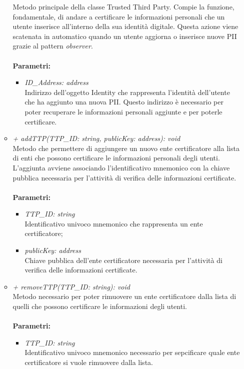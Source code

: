 \begin{itemize}
\begin{itemize}
		Metodo principale della classe Trusted Third Party. Compie la funzione, fondamentale, di andare a certificare le informazioni personali che un utente inserisce all'interno della sua identità digitale. Questa azione viene scatenata in automatico quando un utente aggiorna o inserisce nuove \gls{PII} grazie al pattern \textit{observer}.\\\\
		\textbf{Parametri:}
		\begin{itemize}
			\item \textit{ID\_Address: address}\\
			Indirizzo dell'oggetto Identity che rappresenta l'identità dell'utente che ha aggiunto una nuova \gls{PII}. Questo indirizzo è necessario per poter recuperare le informazioni personali aggiunte e per poterle certificare.			
		\end{itemize}
		\item \textit{+ addTTP(TTP\_ID: string, publicKey: address): void}\\
		Metodo che permettere di aggiungere un nuovo ente certificatore alla lista di enti che possono certificare le informazioni personali degli utenti. L'aggiunta avviene associando l'identificativo mnemonico con la chiave pubblica necessaria per l'attività di verifica delle informazioni certificate.\\\\
		\textbf{Parametri:}
		\begin{itemize}
			\item \textit{TTP\_ID: string}\\
			Identificativo univoco mnemonico che rappresenta un ente certificatore;
			\item \textit{publicKey: address}\\
			Chiave pubblica dell'ente certificatore necessaria per l'attività di verifica delle informazioni certificate.
		\end{itemize}
		\item \textit{+ removeTTP(TTP\_ID: string): void}\\
		Metodo necessario per poter rimuovere un ente certificatore dalla lista di quelli che possono certificare le informazioni degli utenti.\\\\
		\textbf{Parametri:}
		\begin{itemize}
			\item \textit{TTP\_ID: string}\\
			Identificativo univoco mnemonico necessario per sepcificare quale ente certificatore si vuole rimuovere dalla lista.

\end{itemize}
\end{itemize}
\end{itemize}
